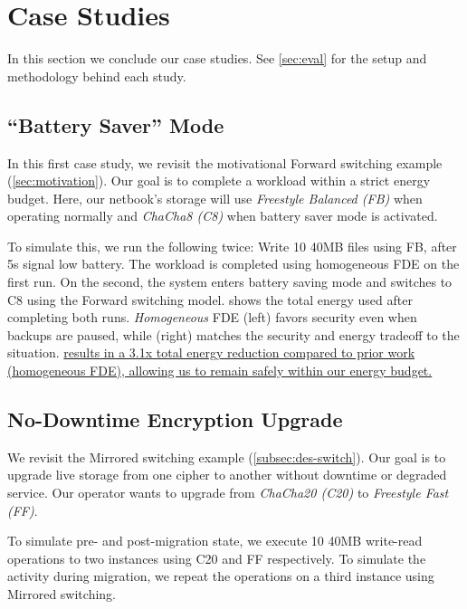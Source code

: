 \section{Case Studies}\label{sec:usecases}

In this section we conclude our case studies. See \cref{sec:eval} for the setup
and methodology behind each study.


\subsection{``Battery Saver'' Mode}\label{subsec:usecase-battery}

In this first case study, we revisit the motivational Forward switching example
(\cref{sec:motivation}). Our goal is to complete a workload within a strict
energy budget. Here, our netbook's storage will use {\em Freestyle Balanced (FB)}
when operating normally and {\em ChaCha8 (C8)} when battery saver mode is
activated.



To simulate this, we run the following twice: Write 10 40MB
files using FB, after 5s signal low battery.
The workload is completed using homogeneous FDE on the first run. On the
second, the system enters battery saving mode and \sys switches to C8
using the Forward switching model.   shows
the total energy used after completing both runs. {\em Homogeneous}
FDE (left) favors security even when backups are paused, while \sys
(right) matches the security and energy tradeoff to the situation.
\uline{\sys results in a 3.1x total energy reduction compared to prior
  work (homogeneous FDE), allowing us to remain safely within our
  energy budget.}


\subsection{No-Downtime Encryption Upgrade}\label{subsec:usecase-upgrade}

We revisit the Mirrored switching example
(\cref{subsec:des-switch}). Our goal is to upgrade live storage from one cipher
to another without downtime or degraded service. Our operator wants to upgrade
from {\em ChaCha20 (C20)} to {\em Freestyle Fast (FF)}.

To simulate pre- and post-migration state, we execute 10 40MB write-read
operations to two \sys instances using C20 and FF respectively. To simulate the
activity during migration, we repeat the operations on a third instance using
Mirrored switching.

